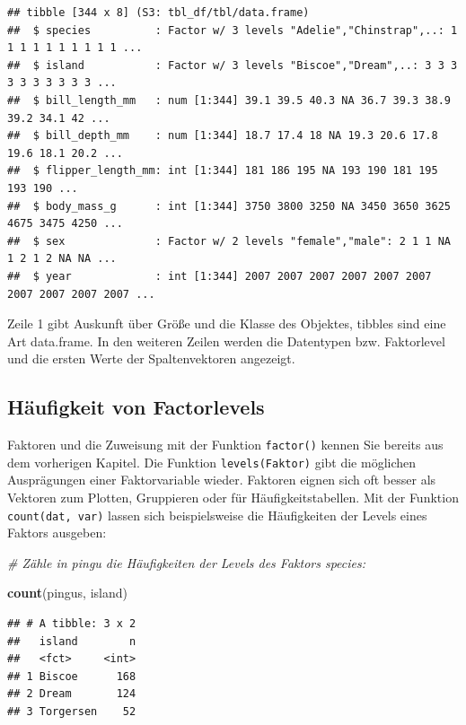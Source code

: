 \documentclass[
  ngerman,
]{book}
\newenvironment{Shaded}{\begin{snugshade}}{\end{snugshade}}
\newcommand{\CommentTok}[1]{\textcolor[rgb]{0.56,0.35,0.01}{\textit{#1}}}
\newcommand{\FunctionTok}[1]{\textcolor[rgb]{0.13,0.29,0.53}{\textbf{#1}}}
\newcommand{\NormalTok}[1]{#1}
\begin{document}
\begin{verbatim}
## tibble [344 x 8] (S3: tbl_df/tbl/data.frame)
##  $ species          : Factor w/ 3 levels "Adelie","Chinstrap",..: 1 1 1 1 1 1 1 1 1 1 ...
##  $ island           : Factor w/ 3 levels "Biscoe","Dream",..: 3 3 3 3 3 3 3 3 3 3 ...
##  $ bill_length_mm   : num [1:344] 39.1 39.5 40.3 NA 36.7 39.3 38.9 39.2 34.1 42 ...
##  $ bill_depth_mm    : num [1:344] 18.7 17.4 18 NA 19.3 20.6 17.8 19.6 18.1 20.2 ...
##  $ flipper_length_mm: int [1:344] 181 186 195 NA 193 190 181 195 193 190 ...
##  $ body_mass_g      : int [1:344] 3750 3800 3250 NA 3450 3650 3625 4675 3475 4250 ...
##  $ sex              : Factor w/ 2 levels "female","male": 2 1 1 NA 1 2 1 2 NA NA ...
##  $ year             : int [1:344] 2007 2007 2007 2007 2007 2007 2007 2007 2007 2007 ...
\end{verbatim}

Zeile 1 gibt Auskunft über Größe und die Klasse des Objektes, tibbles sind eine Art data.frame. In den weiteren Zeilen werden die Datentypen bzw. Faktorlevel und die ersten Werte der Spaltenvektoren angezeigt.

\subsection{Häufigkeit von Factorlevels}\label{huxe4ufigkeit-von-factorlevels}

Faktoren und die Zuweisung mit der Funktion \texttt{factor()} kennen Sie bereits aus dem vorherigen Kapitel. Die Funktion \texttt{levels(Faktor)} gibt die möglichen Ausprägungen einer Faktorvariable wieder. Faktoren eignen sich oft besser als Vektoren zum Plotten, Gruppieren oder für Häufigkeitstabellen. Mit der Funktion \texttt{count(dat,\ var)} lassen sich beispielsweise die Häufigkeiten der Levels eines Faktors ausgeben:

\begin{Shaded}
\begin{Highlighting}[]
\CommentTok{\# Zähle in pingu die Häufigkeiten der Levels des Faktors species:}

\FunctionTok{count}\NormalTok{(pingus, island)}
\end{Highlighting}
\end{Shaded}

\begin{verbatim}
## # A tibble: 3 x 2
##   island        n
##   <fct>     <int>
## 1 Biscoe      168
## 2 Dream       124
## 3 Torgersen    52
\end{verbatim}
\end{document}
